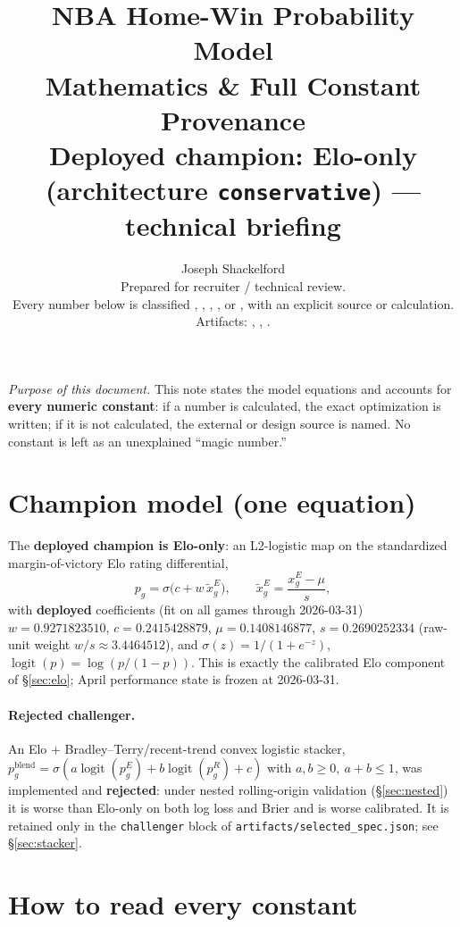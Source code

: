 \documentclass[10pt]{article}
\title{\textbf{NBA Home-Win Probability Model}\\[0.25em]
\large Mathematics \& Full Constant Provenance\\[0.15em]
\normalsize Deployed champion: Elo-only (architecture \texttt{conservative}) --- technical briefing}
\author{Joseph Shackelford\\[0.15em]
\small Prepared for recruiter / technical review.\\
\small Every number below is classified
\cls{Fixed}, \cls{Selected}, \cls{Fitted}, \cls{Derived}, or \cls{Numerical},
with an explicit source or calculation.\\
\small Artifacts: \code{artifacts/selected\_spec.json},
\code{march\_architecture\_results.csv},
\code{coefficient\_table.csv}.}
\date{}
\newcommand{\code}[1]{\texttt{#1}}
\begin{document}
\maketitle
\vspace{-1.0em}

\noindent\textit{Purpose of this document.}
This note states the model equations and accounts for \textbf{every numeric
constant}: if a number is calculated, the exact optimization is written; if it
is not calculated, the external or design source is named. No constant is left
as an unexplained ``magic number.''

\section{Champion model (one equation)}

The \textbf{deployed champion is Elo-only}: an L2-logistic map on the
standardized margin-of-victory Elo rating differential,
\[
\boxed{
p_g
=
\sigma\!\bigl(c + w\,\tilde x_g^{E}\bigr)
},
\qquad
\tilde x_g^{E}=\frac{x_g^{E}-\mu}{s},
\]
with \textbf{deployed} coefficients (fit on all games through 2026-03-31)
\(w=0.9271823510\),
\(c=0.2415428879\),
\(\mu=0.1408146877\),
\(s=0.2690252334\)
(raw-unit weight \(w/s\approx 3.4464512\)),
and
\(\sigma(z)=1/(1+e^{-z})\),
\(\operatorname{logit}(p)=\log(p/(1-p))\). This is exactly the calibrated Elo
component of \S\ref{sec:elo}; April performance state is frozen at 2026-03-31.

\paragraph{Rejected challenger.} An Elo \(+\) Bradley--Terry/recent-trend
convex logistic stacker,
\(p_g^{\mathrm{blend}}=\sigma(a\operatorname{logit}(p_g^{E})+b\operatorname{logit}(p_g^{R})+c)\)
with \(a,b\ge0,\ a+b\le1\), was implemented and \textbf{rejected}: under nested
rolling-origin validation (\S\ref{sec:nested}) it is worse than Elo-only on both
log loss and Brier and is worse calibrated. It is retained only in the
\code{challenger} block of \code{artifacts/selected\_spec.json}; see
\S\ref{sec:stacker}.

\section{How to read every constant}
\end{document}

